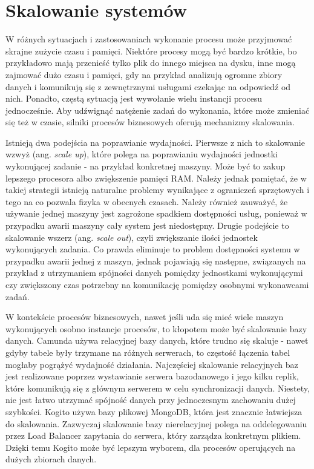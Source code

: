 \documentclass[declaration,shortabstract,mgr]{iithesis}
\begin{document}
\section{Skalowanie systemów}

W różnych sytuacjach i zastosowaniach wykonanie procesu może przyjmować skrajne zużycie czasu i pamięci. Niektóre procesy mogą być bardzo krótkie, bo przykładowo mają przenieść tylko plik do innego miejsca na dysku, inne mogą zajmować dużo czasu i pamięci, gdy na przykład analizują ogromne zbiory danych i komunikują się z zewnętrznymi usługami czekając na odpowiedź od nich. Ponadto, częstą sytuacją jest wywołanie wielu instancji procesu jednocześnie. Aby udźwignąć natężenie zadań do wykonania, które może zmieniać się też w czasie, silniki procesów biznesowych oferują mechanizmy skalowania.

Istnieją dwa podejścia na poprawianie wydajności. Pierwsze z nich to skalowanie wzwyż (ang. \textit{scale up}), które polega na poprawianiu wydajności jednostki wykonującej zadanie - na przykład konkretnej maszyny. Może być to zakup lepszego procesora albo zwiększenie pamięci RAM. Należy jednak pamiętać, że w takiej strategii istnieją naturalne problemy wynikające z ograniczeń sprzętowych i tego na co pozwala fizyka w obecnych czasach. Należy również zauważyć, że używanie jednej maszyny jest zagrożone spadkiem dostępności usług, ponieważ w przypadku awarii maszyny cały system jest niedostępny. Drugie podejście to skalowanie wszerz (ang. \textit{scale out}), czyli zwiększanie ilości jednostek wykonujących zadania. Co prawda eliminuje to problem dostępności systemu w przypadku awarii jednej z maszyn, jednak pojawiają się następne, związanych na przykład z utrzymaniem spójności danych pomiędzy jednostkami wykonującymi czy zwiększony czas potrzebny na komunikację pomiędzy osobnymi wykonawcami zadań.

W kontekście procesów biznesowych, nawet jeśli uda się mieć wiele maszyn wykonujących osobno instancje procesów, to kłopotem może być skalowanie bazy danych. Camunda używa relacyjnej bazy danych, które trudno się skaluje - nawet gdyby tabele były trzymane na różnych serwerach, to częstość łączenia tabel mogłaby pogrążyć wydajność działania. Najczęściej skalowanie relacyjnych baz jest realizowane poprzez wystawianie serwera bazodanowego i jego kilku replik, które komunikują się z głównym serwerem w celu synchronizacji danych. Niestety, nie jest łatwo utrzymać spójność danych przy jednoczesnym zachowaniu dużej szybkości. Kogito używa bazy plikowej MongoDB, która jest znacznie łatwiejsza do skalowania. Zazwyczaj skalowanie bazy nierelacyjnej polega na oddelegowaniu przez Load Balancer zapytania do serwera, który zarządza konkretnym plikiem. Dzięki temu Kogito może być lepszym wyborem, dla procesów operujących na dużych zbiorach danych.
\end{document}
